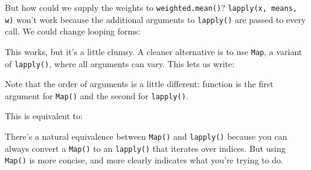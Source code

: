 But how could we supply the weights to \texttt{weighted.mean()}?
\texttt{lapply(x, means, w)} won't work because the additional arguments
to \texttt{lapply()} are passed to every call. We could change looping
forms:

\begin{Shaded}
\begin{Highlighting}[]
\NormalTok{(}\NormalTok{(}
\NormalTok{\}))}
\end{Highlighting}
\end{Shaded}

This works, but it's a little clumsy. A cleaner alternative is to use
\texttt{Map}, a variant of \texttt{lapply()}, where all arguments can
vary. This lets us write:

\begin{Shaded}
\begin{Highlighting}[]
\NormalTok{(}
\end{Highlighting}
\end{Shaded}

Note that the order of arguments is a little different: function is the
first argument for \texttt{Map()} and the second for \texttt{lapply()}.

This is equivalent to:

\begin{Shaded}
\begin{Highlighting}[]
\NormalTok{(}\StringTok{ }
\StringTok{ }\NormalTok{(}\NormalTok{, }
  \StringTok{ }
\NormalTok{\}}
\end{Highlighting}
\end{Shaded}

There's a natural equivalence between \texttt{Map()} and
\texttt{lapply()} because you can always convert a \texttt{Map()} to an
\texttt{lapply()} that iterates over indices. But using \texttt{Map()}
is more concise, and more clearly indicates what you're trying to do.

